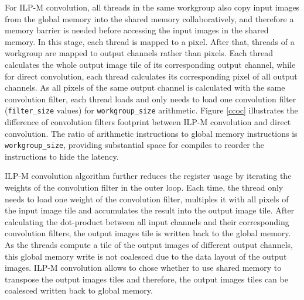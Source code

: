 \documentclass{article}
\begin{document}
For ILP-M convolution, all threads in the same workgroup also copy input images from the global memory into the shared memory collaboratively, and therefore a memory barrier is needed before accessing the input images in the shared memory. In this stage, each thread is mapped to a pixel. After that, threads of a workgroup are mapped to output channels rather than pixels. Each thread calculates the whole output image tile of its corresponding output channel, while for direct convolution, each thread calculates its corresponding pixel of all output channels. As all pixels of the same output channel is calculated with the same convolution filter, each thread loads and only needs to load one convolution filter (\texttt{filter\_size} values) for \texttt{workgroup\_size} arithmetic. Figure \ref{ccoc} illustrates the difference of convolution filters footprint between ILP-M convolution and direct convolution. The ratio of arithmetic instructions to global memory instructions is \texttt{workgroup\_size}, providing substantial space for compiles to reorder the instructions to hide the latency.

ILP-M convolution algorithm further reduces the register usage by iterating the weights of the convolution filter in the outer loop. Each time, the thread only needs to load one weight of the convolution filter, multiples it with all pixels of the input image tile and accumulates the result into the output image tile. After calculating the dot-product between all input channels and their corresponding convolution filters, the output images tile is written back to the global memory. As the threads compute a tile of the output images of different output channels, this global memory write is not coalesced due to the data layout of the output images. ILP-M convolution allows to chose whether to use shared memory to transpose the output images tiles and therefore, the output images tiles can be coalesced written back to global memory.


\end{document}
